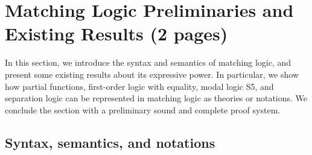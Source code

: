 \documentclass[letter,12pt]{article}
\begin{document}
\section{Matching Logic Preliminaries and Existing Results (2 pages)}

In this section, we introduce the syntax and semantics of matching logic,
and present some existing results about its expressive power.
In particular, we show how
partial functions,
first-order logic with equality,
modal logic S5,
and separation logic can be represented in matching logic
as theories or notations.
We conclude the section with a preliminary sound and complete proof system.

\subsection{Syntax, semantics, and notations}
\label{sec_syntax_semantics_notations}
\end{document}
